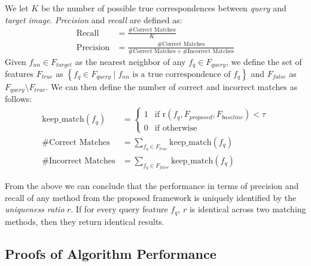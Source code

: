 \documentclass[10pt,journal,cspaper,compsoc]{IEEEtran}
\newcommand{\twopartdef}[4]
{
	\left\{
		\begin{array}{ll}
			#1 & \mbox{if } #2 \\
			#3 & \mbox{if } #4
		\end{array}
	\right.
}
\begin{document}
We let $K$ be the number of possible true correspondences between \emph{query} 
and \emph{target image}. \emph{Precision} and \emph{recall} are 
defined as:
\begin{align*}
    \textrm{Recall} &= \frac{\#\textrm{Correct Matches}}{K} \\
    \textrm{Precision} &= \frac{\#\textrm{Correct 
    Matches}}{\#\textrm{Correct Matches} + \#\textrm{Incorrect Matches}}
\end{align*}
Given $f_{nn} \in F_{target}$ as the nearest neighbor of any 
$f_q \in F_{query}$, we define the set of features $F_{true}$ as 
$\left\{ f_{q} \in F_{query} \mid f_{nn} \text{ is a true correspondence 
of } f_{q} \right\}$ and $F_{false}$ as $F_{query} \setminus F_{true}$.  
We can then define the number of correct and incorrect matches as 
follows:
\begin{align*}
    \textrm{keep\_match}(f_{q}) &= \twopartdef{ 1 }{\text{r}(f_{q}, 
    F_{proposed}, F_{baseline}) <
    \tau}{0}{\textrm{otherwise}} \\
    \#\textrm{Correct Matches} &= \sum_{f_{q} \in F_{true}} 
    \textrm{keep\_match}(f_{q})\\
    \#\textrm{Incorrect Matches} &= \sum_{f_{q} \in F_{false}}
    \textrm{keep\_match}(f_{q})
\end{align*}

From the above we can conclude that the performance in terms of 
precision and recall of any method from the proposed framework is 
uniquely identified by the \emph{uniqueness ratio} $r$.  If for every query 
feature $f_{q}$, $r$ is identical across two matching methods, then they 
return identical results. 


\subsection{Proofs of Algorithm Performance}
\label{S:Proofs}
\end{document}
